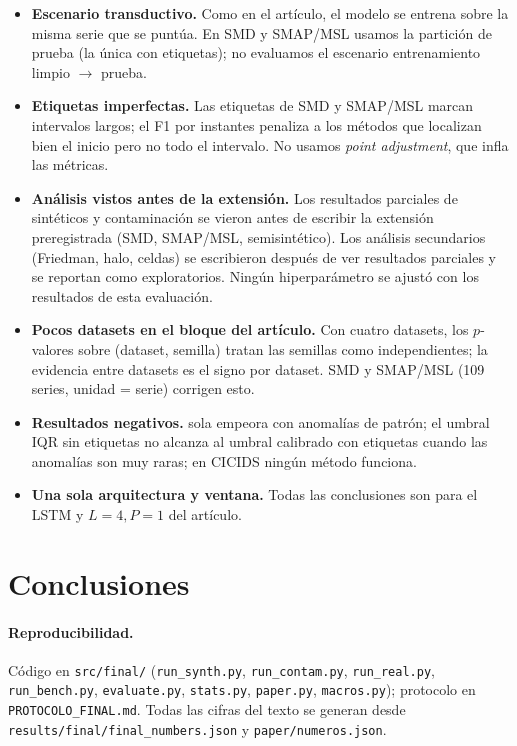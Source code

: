 \documentclass[10pt,a4paper]{article}
\begin{document}
\begin{itemize}
\item \textbf{Escenario transductivo.} Como en el artículo, el modelo se entrena sobre la misma serie que se
puntúa. En SMD y SMAP/MSL usamos la partición de prueba (la única con etiquetas); no evaluamos el escenario
entrenamiento limpio $\to$ prueba.
\item \textbf{Etiquetas imperfectas.} Las etiquetas de SMD y SMAP/MSL marcan intervalos largos; el F1 por
instantes penaliza a los métodos que localizan bien el inicio pero no todo el intervalo. No usamos
\emph{point adjustment}, que infla las métricas.
\item \textbf{Análisis vistos antes de la extensión.} Los resultados parciales de sintéticos y contaminación
se vieron antes de escribir la extensión preregistrada (SMD, SMAP/MSL, semisintético). Los análisis
secundarios (Friedman, halo, celdas) se escribieron después de ver resultados parciales y se reportan como
exploratorios. Ningún hiperparámetro se ajustó con los resultados de esta evaluación.
\item \textbf{Pocos datasets en el bloque del artículo.} Con cuatro datasets, los $p$-valores sobre
(dataset, semilla) tratan las semillas como independientes; la evidencia entre datasets es el signo por
dataset. SMD y SMAP/MSL (109 series, unidad = serie) corrigen esto.
\item \textbf{Resultados negativos.} \MIII{} sola empeora con anomalías de patrón; el umbral IQR sin
etiquetas no alcanza al umbral calibrado con etiquetas cuando las anomalías son muy raras; en CICIDS ningún
método funciona.
\item \textbf{Una sola arquitectura y ventana.} Todas las conclusiones son para el LSTM y $L{=}4,P{=}1$ del
artículo.
\end{itemize}

\section{Conclusiones}


\paragraph{Reproducibilidad.} Código en \texttt{src/final/} (\texttt{run\_synth.py}, \texttt{run\_contam.py},
\texttt{run\_real.py}, \texttt{run\_bench.py}, \texttt{evaluate.py}, \texttt{stats.py}, \texttt{paper.py},
\texttt{macros.py}); protocolo en \texttt{PROTOCOLO\_FINAL.md}. Todas las cifras del texto se generan desde
\texttt{results/final/final\_numbers.json} y \texttt{paper/numeros.json}.
\end{document}
